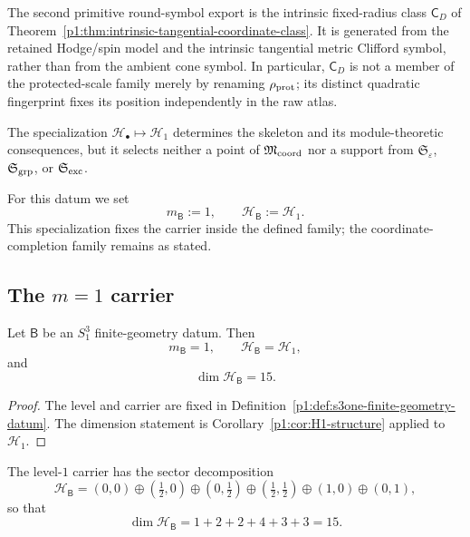 \documentclass[11pt]{article}
\begin{document}
\begin{definition}
The second primitive round-symbol export is the intrinsic fixed-radius class
\(\mathsf C_D\) of
Theorem~\ref{p1:thm:intrinsic-tangential-coordinate-class}.  It is generated
from the retained Hodge/spin model and the intrinsic tangential metric
Clifford symbol, rather than from the ambient cone symbol.  In particular,
\(\mathsf C_D\) is not a member of the protected-scale family merely by
renaming \(\rho_{\rm prot}\); its distinct quadratic fingerprint fixes its
position independently in the raw atlas.

The specialization \(\mathcal H_\bullet\mapsto\mathcal H_1\) determines the
skeleton and its module-theoretic consequences, but it selects neither a point
of \(\mathfrak M_{\rm coord}\) nor a support from
\(\mathfrak S_\varepsilon\), \(\mathfrak S_{\rm grp}\), or
\(\mathfrak S_{\rm exc}\).

For this datum we set
\[
    m_{\mathsf B}:=1,
    \qquad
    \mathcal H_{\mathsf B}:=\mathcal H_1.
\]
This specialization fixes the carrier inside the defined family; the
coordinate-completion family remains as stated.
\end{definition}

\subsection{The \texorpdfstring{\(m=1\)}{m=1} carrier}

\begin{proposition}
\label{p1:prop:s3one-carrier}
Let \(\mathsf B\) be an \(S^3_1\) finite-geometry datum.  Then
\[
    m_{\mathsf B}=1,
    \qquad
    \mathcal H_{\mathsf B}=\mathcal H_1,
\]
and
\[
    \dim\mathcal H_{\mathsf B}=15.
\]
\end{proposition}

\begin{proof}
The level and carrier are fixed in Definition~\ref{p1:def:s3one-finite-geometry-datum}.  The dimension statement is Corollary~\ref{p1:cor:H1-structure} applied to \(\mathcal H_1\).
\end{proof}

\begin{corollary}
\label{p1:cor:s3one-sector-content}
The level-\(1\) carrier has the sector decomposition
\[
\mathcal H_{\mathsf B}
=
(0,0)
\oplus
(\tfrac12,0)
\oplus
(0,\tfrac12)
\oplus
(\tfrac12,\tfrac12)
\oplus
(1,0)
\oplus
(0,1),
\]
so that
\[
    \dim\mathcal H_{\mathsf B}
    =1+2+2+4+3+3=15.
\]
\end{corollary}
\end{document}
